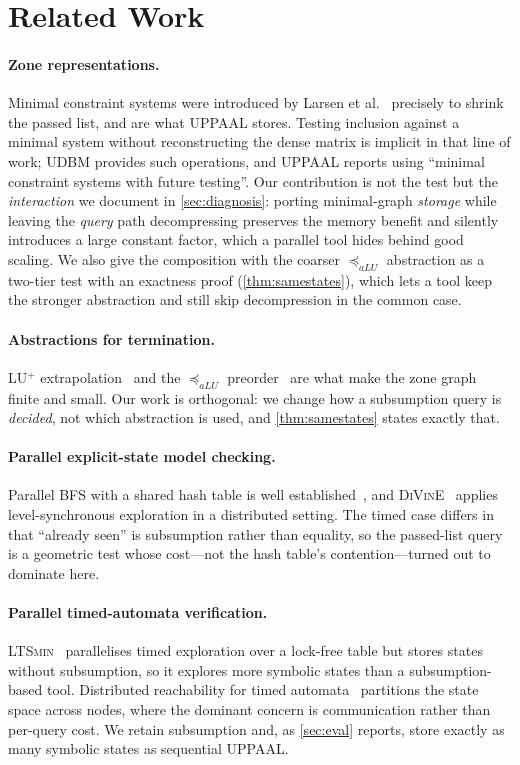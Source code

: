 \section{Related Work}\label{sec:related}

\paragraph{Zone representations.}
Minimal constraint systems were introduced by Larsen et
al.~\cite{LarsenLPY97} precisely to shrink the passed list, and are what UPPAAL
stores.  Testing inclusion against a minimal system without reconstructing the
dense matrix is implicit in that line of work; UDBM provides such operations, and
UPPAAL reports using ``minimal constraint systems with future testing''.  Our
contribution is not the test but the \emph{interaction} we document in
\cref{sec:diagnosis}: porting minimal-graph \emph{storage} while leaving the
\emph{query} path decompressing preserves the memory benefit and silently
introduces a large constant factor, which a parallel tool hides behind good
scaling.  We also give the composition with the coarser $\preceq_{aLU}$
abstraction as a two-tier test with an exactness proof
(\cref{thm:samestates}), which lets a tool keep the stronger abstraction and
still skip decompression in the common case.

\paragraph{Abstractions for termination.}
LU$^+$ extrapolation~\cite{Behrmann06} and the $\preceq_{aLU}$
preorder~\cite{Herbreteau12} are what make the zone graph finite and small.  Our
work is orthogonal: we change how a subsumption query is \emph{decided}, not
which abstraction is used, and \cref{thm:samestates} states exactly that.

\paragraph{Parallel explicit-state model checking.}
Parallel BFS with a shared hash table is well established~\cite{Stern01}, and
\textsc{DiVinE}~\cite{Barnat12} applies level-synchronous exploration in a
distributed setting.  The timed case differs in that ``already seen'' is
subsumption rather than equality, so the passed-list query is a geometric test
whose cost---not the hash table's contention---turned out to dominate here.

\paragraph{Parallel timed-automata verification.}
\textsc{LTSmin}~\cite{Kant15} parallelises timed exploration over a lock-free
table but stores states without subsumption, so it explores more symbolic states
than a subsumption-based tool.  Distributed reachability for timed
automata~\cite{Behrmann03} partitions the state space across nodes, where the
dominant concern is communication rather than per-query cost.  We retain
subsumption and, as \cref{sec:eval} reports, store exactly as many symbolic
states as sequential UPPAAL.

